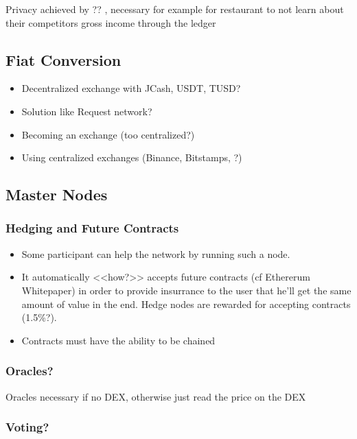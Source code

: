 \documentclass[a4paper]{article}
\begin{document}
Privacy achieved by ?? , necessary for example for restaurant to not learn about their competitors gross income through the ledger

\subsection{Fiat Conversion}

\begin{itemize}
\item Decentralized exchange with JCash, USDT, TUSD?
\item Solution like Request network?
\item Becoming an exchange (too centralized?)
\item Using centralized exchanges (Binance, Bitstamps, ?)
\end{itemize}

\subsection{Master Nodes}

\subsubsection{Hedging and Future Contracts}

\begin{itemize}
\item Some participant can help the network by running such a node.
\item It automatically <<how?>> accepts future contracts (cf Ethererum Whitepaper) in order to provide insurrance to the user that he'll get the same amount of value in the end. Hedge nodes are rewarded for accepting contracts (1.5\%?).
\item Contracts must have the ability to be chained
\end{itemize}

\subsubsection{Oracles?}

Oracles necessary if no DEX, otherwise just read the price on the DEX

\subsubsection{Voting?}
\end{document}

